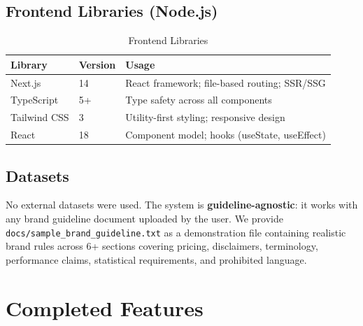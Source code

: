 \documentclass[11pt,a4paper]{article}
\begin{document}
\subsection{Frontend Libraries (Node.js)}

\begin{table}[H]
\centering
\begin{tabular}{p{} p{} p{}}
\toprule
\textbf{Library} & \textbf{Version} & \textbf{Usage} \\
\midrule
Next.js & 14 & React framework; file-based routing; SSR/SSG \\
\addlinespace
TypeScript & 5+ & Type safety across all components \\
\addlinespace
Tailwind CSS & 3 & Utility-first styling; responsive design \\
\addlinespace
React & 18 & Component model; hooks (useState, useEffect) \\
\bottomrule
\end{tabular}
\caption{Frontend Libraries}
\end{table}

\subsection{Datasets}

No external datasets were used. The system is \textbf{guideline-agnostic}: it works with any brand guideline document uploaded by the user. We provide \texttt{docs/sample\_brand\_guideline.txt} as a demonstration file containing realistic brand rules across 6+ sections covering pricing, disclaimers, terminology, performance claims, statistical requirements, and prohibited language.

\section{Completed Features}
\end{document}

